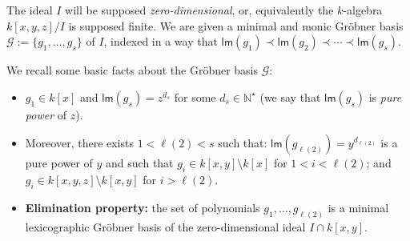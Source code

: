 \documentclass[a4paper,11pt]{article}
\def\G{\ensuremath{\mathcal{G}}}
\def\N{\ensuremath{\mathbb{N}}}
\def\lm{\ensuremath{{\mathsf{lm}}}}
\begin{document}
The ideal $I$ will be supposed {\em zero-dimensional},
or, equivalently the $k$-algebra $k[x,y,z]/I$ is supposed finite.
We are given a minimal and monic Gr\"obner basis 
$\G:=\{ g_1,\ldots,g_s\}$ of $I$,
indexed in a way that $\lm(g_1)\prec \lm(g_2) \prec \cdots \prec \lm(g_s)$.
 \smallskip

We recall some basic facts about the Gr\"obner basis $\G$: 
\begin{itemize}
\item  $g_1\in k[x]$ and $\lm(g_s)=z^{d_s}$ for some $d_s\in \N^\star$
(we say that $\lm(g_s)$ is {\em pure power} of $z$).
\item Moreover, there exists $1<\ell(2)<s$ such that:
$\lm(g_{\ell(2)})=y^{d_{\ell(2)}}$ is a pure power of $y$ and
such that
$g_i \in k[x,y] \setminus k[x]$ for $1<i<\ell(2)$;
and $g_i\in k[x,y,z] \setminus k[x,y]$ for $i>\ell(2)$.
\item {\bf Elimination property:} the set of polynomials
$g_1 , \ldots , g_{\ell(2)}$ is a minimal lexicographic
Gr\"obner basis of the zero-dimensional ideal $I\cap k[x,y]$.
\end{itemize}
\end{document}
